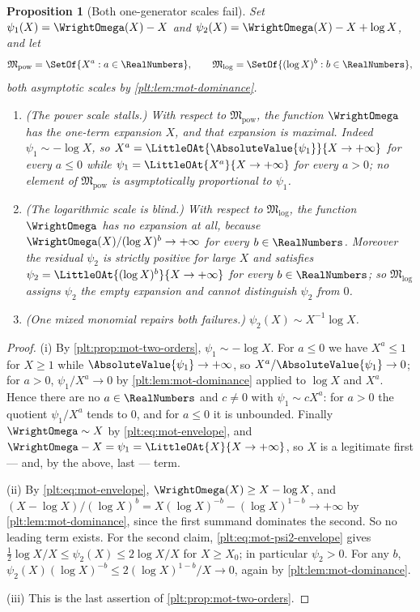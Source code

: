 \documentclass[11pt,oneside]{article}
\theoremstyle{plain}
\newtheorem{proposition}[theorem]{Proposition}
\theoremstyle{definition}
\theoremstyle{remark}
\begin{document}
\begin{proposition}[Both one-generator scales fail]
\label{plt:prop:mot-one-generator-fails}
Set \(\psi_{1}(X)=\WrightOmega(X)-X\) and
\(\psi_{2}(X)=\WrightOmega(X)-X+\log X\), and let
\[
  \mathfrak{M}_{\mathrm{pow}}=\SetOf{X^{a}:a\in\RealNumbers},
  \qquad
  \mathfrak{M}_{\log}=\SetOf{(\log X)^{b}:b\in\RealNumbers},
\]
both asymptotic scales by \cref{plt:lem:mot-dominance}.
\begin{enumerate}
\item \emph{(The power scale stalls.)}  With respect to
  \(\mathfrak{M}_{\mathrm{pow}}\), the function \(\WrightOmega\) has the
  one-term expansion \(X\), and that expansion is maximal.  Indeed
  \(\psi_{1}\sim-\log X\), so
  \(X^{a}=\LittleOAt{\AbsoluteValue{\psi_{1}}}{X\to+\infty}\) for every
  \(a\le0\) while \(\psi_{1}=\LittleOAt{X^{a}}{X\to+\infty}\) for every
  \(a>0\); no element of \(\mathfrak{M}_{\mathrm{pow}}\) is asymptotically
  proportional to \(\psi_{1}\).
\item \emph{(The logarithmic scale is blind.)}  With respect to
  \(\mathfrak{M}_{\log}\), the function \(\WrightOmega\) has no expansion at
  all, because \(\WrightOmega(X)/(\log X)^{b}\to+\infty\) for every
  \(b\in\RealNumbers\).  Moreover the residual \(\psi_{2}\) is strictly
  positive for large \(X\) and satisfies
  \(\psi_{2}=\LittleOAt{(\log X)^{b}}{X\to+\infty}\) for \emph{every}
  \(b\in\RealNumbers\); so \(\mathfrak{M}_{\log}\) assigns \(\psi_{2}\) the
  empty expansion and cannot distinguish \(\psi_{2}\) from \(0\).
\item \emph{(One mixed monomial repairs both failures.)}
  \(\psi_{2}(X)\sim X^{-1}\log X\).
\end{enumerate}
\end{proposition}

\begin{proof}
(i) By \cref{plt:prop:mot-two-orders}, \(\psi_{1}\sim-\log X\).  For
\(a\le0\) we have \(X^{a}\le1\) for \(X\ge1\) while
\(\AbsoluteValue{\psi_{1}}\to+\infty\), so
\(X^{a}/\AbsoluteValue{\psi_{1}}\to0\); for \(a>0\),
\(\psi_{1}/X^{a}\to0\) by \cref{plt:lem:mot-dominance} applied to
\(\log X\) and \(X^{a}\).  Hence there are no \(a\in\RealNumbers\) and
\(c\ne0\) with \(\psi_{1}\sim cX^{a}\): for \(a>0\) the quotient
\(\psi_{1}/X^{a}\) tends to \(0\), and for \(a\le0\) it is unbounded.  Finally
\(\WrightOmega\sim X\) by \eqref{plt:eq:mot-envelope}, and
\(\WrightOmega-X=\psi_{1}=\LittleOAt{X}{X\to+\infty}\), so \(X\) is a
legitimate first --- and, by the above, last --- term.

(ii) By \eqref{plt:eq:mot-envelope}, \(\WrightOmega(X)\ge X-\log X\), and
\((X-\log X)/(\log X)^{b}=X(\log X)^{-b}-(\log X)^{1-b}\to+\infty\) by
\cref{plt:lem:mot-dominance}, since the first summand dominates the second.  So
no leading term exists.  For the second claim,
\eqref{plt:eq:mot-psi2-envelope} gives
\(\tfrac12\log X/X\le\psi_{2}(X)\le2\log X/X\) for \(X\ge X_{0}\); in
particular \(\psi_{2}>0\).  For any \(b\),
\(\psi_{2}(X)(\log X)^{-b}\le2(\log X)^{1-b}/X\to0\), again by
\cref{plt:lem:mot-dominance}.

(iii) This is the last assertion of \cref{plt:prop:mot-two-orders}.
\end{proof}
\end{document}
